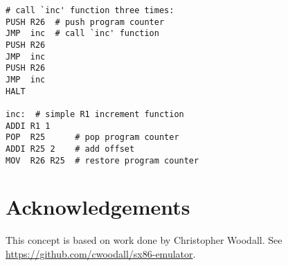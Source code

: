 \documentclass[12pt]{scrartcl}
\begin{document}
\begin{lstlisting}
# call `inc' function three times:
PUSH R26  # push program counter
JMP  inc  # call `inc' function
PUSH R26
JMP  inc
PUSH R26
JMP  inc
HALT

inc:  # simple R1 increment function
ADDI R1 1
POP  R25      # pop program counter
ADDI R25 2    # add offset
MOV  R26 R25  # restore program counter
\end{lstlisting}




\section{Acknowledgements}

This concept is based on work done by Christopher Woodall. See \url{https://github.com/cwoodall/sx86-emulator}.
\end{document}
